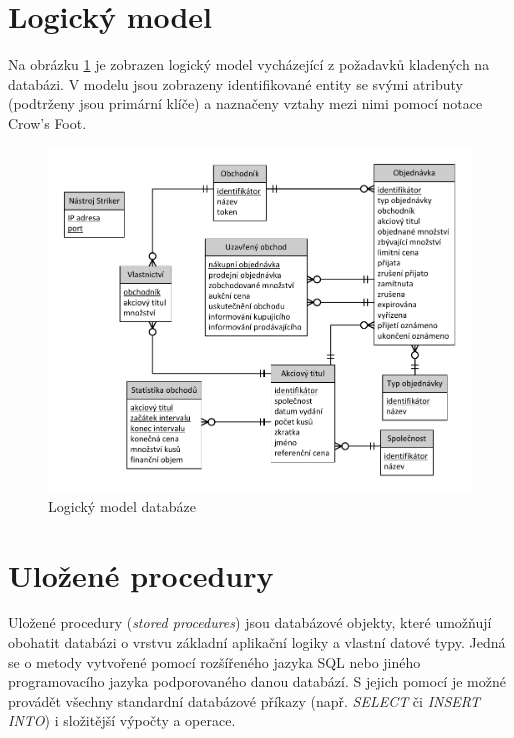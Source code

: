 \documentclass[thesis=M,czech]{FITthesis}[2012/06/26]
\begin{document}

\section{Logický model} 

Na obrázku \ref{fig:log-model} je zobrazen logický model vycházející z požadavků kladených na databázi. 
V modelu jsou zobrazeny identifikované entity se svými atributy (podtrženy jsou primární klíče) a naznačeny vztahy
mezi nimi pomocí notace Crow's Foot. \cite{umlsroz, dbsdim}  %


\begin{figure}\centering
	\includegraphics[width=\textwidth]{images/DB-log-model} 
	\caption[Logický model databáze]{Logický model databáze}\label{fig:log-model}
\end{figure}


\section{Uložené procedury}

Uložené procedury (\textit{stored procedures}) jsou databázové objekty, které umožňují obohatit databázi o vrstvu základní aplikační 
logiky a vlastní datové typy. Jedná se o metody vytvořené pomocí rozšířeného jazyka SQL nebo jiného programovacího jazyka podporovaného danou 
databází. S jejich pomocí je možné provádět všechny standardní databázové příkazy (např. \textit{SELECT} či \textit{INSERT INTO}) 
i složitější výpočty a operace.
\end{document}
